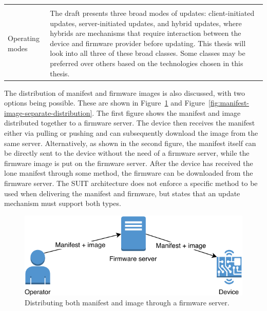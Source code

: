 \documentclass[0-thesis.tex]{subfiles}
\begin{document}
\begin{small}
\begin{longtable}[]{@{}ll@{}}
\begin{minipage}[t]{0.53\columnwidth}
        \end{minipage}\tabularnewline
        \begin{minipage}[t]{0.41\columnwidth}\raggedright\strut
        Operating modes\strut
        \end{minipage} & \begin{minipage}[t]{0.53\columnwidth}\raggedright\strut
        The draft presents three broad modes of updates: client-initiated
        updates, server-initiated updates, and hybrid updates, where hybrids are
        mechanisms that require interaction between the device and firmware
        provider before updating. This thesis will look into all three of these
        broad classes. Some classes may be preferred over others based on the
        technologies chosen in this thesis.\strut
        \end{minipage}\tabularnewline
        \bottomrule
\end{longtable}
\end{small}
        

The distribution of manifest and firmware images is also discussed, with two options being
possible. These are shown in Figure~\ref{fig:manifest-image-combined-distribution} and
Figure~\ref{fig:manifest-image-separate-distribution}. The first figure shows the manifest
and image distributed together to a firmware server. The device then receives the manifest
either via pulling or pushing and can subsequently download the image from the same
server. Alternatively, as shown in the second figure, the manifest itself can be directly
sent to the device without the need of a firmware server, while the firmware image is put
on the firmware server. After the device has received the lone manifest through some
method, the firmware can be downloaded from the firmware server. The SUIT architecture
does not enforce a specific method to be used when delivering the manifest and firmware,
but states that an update mechanism must support both types.

\begin{figure}[h]
    \caption{Distributing both manifest and image through a firmware server.}   
    \label{fig:manifest-image-combined-distribution}
    \includegraphics{images/together.pdf}
\end{figure}
\end{document}
